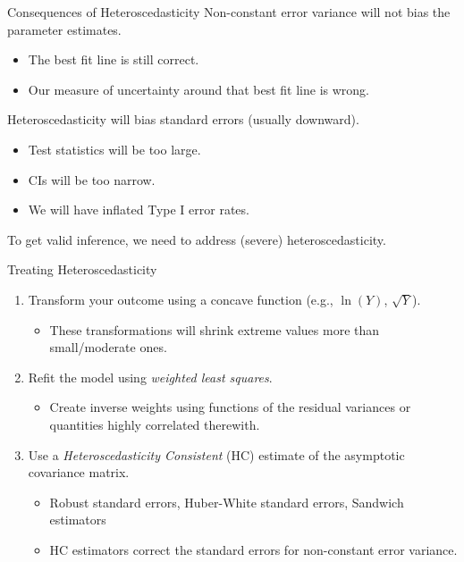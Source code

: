 \documentclass[10pt]{beamer}\usepackage[]{graphicx}\usepackage[]{color}
\begin{document}
{\begin{frame}{Consequences of Heteroscedasticity}
  Non-constant error variance will not bias the parameter estimates.
  \begin{itemize}
  \item The best fit line is still correct.
  \item Our measure of uncertainty around that best fit line is wrong.
  \end{itemize}
  \vb
  Heteroscedasticity will bias standard errors (usually downward).
  \begin{itemize}
  \item Test statistics will be too large.
  \item CIs will be too narrow.
  \item We will have inflated Type I error rates.
  \end{itemize}
  \vb
  To get valid inference, we need to address (severe) heteroscedasticity.

\end{frame}


\begin{frame}{Treating Heteroscedasticity}

  \begin{enumerate}
  \item Transform your outcome using a concave function (e.g., $\ln(Y)$,
    $\sqrt{Y}$).
    \vc
    \begin{itemize}
    \item These transformations will shrink extreme values more than
      small/moderate ones.
    \end{itemize}
    \vb
  \item Refit the model using \emph{weighted least squares}.
    \vc
    \begin{itemize}
    \item Create inverse weights using functions of the residual variances or
      quantities highly correlated therewith.
    \end{itemize}
    \vb
  \item Use a \emph{Heteroscedasticity Consistent} (HC) estimate of the
    asymptotic covariance matrix.
    \vc
    \begin{itemize}
    \item Robust standard errors, Huber-White standard errors, Sandwich
      estimators
    \item HC estimators correct the standard errors for non-constant error
      variance.
    \end{itemize}
  \end{enumerate}


\end{frame}}
\end{document}

